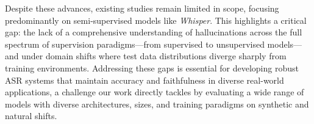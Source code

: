 Despite these advances, existing studies remain limited in scope, focusing predominantly on semi-supervised models like \emph{Whisper}. This highlights a critical gap: the lack of a comprehensive understanding of hallucinations across the full spectrum of supervision paradigms—from supervised to unsupervised models—and under domain shifts where test data distributions diverge sharply from training environments. Addressing these gaps is essential for developing robust ASR systems that maintain accuracy and faithfulness in diverse real-world applications, a challenge our work directly tackles by evaluating a wide range of models with diverse architectures, sizes, and training paradigms on synthetic and natural shifts. 

